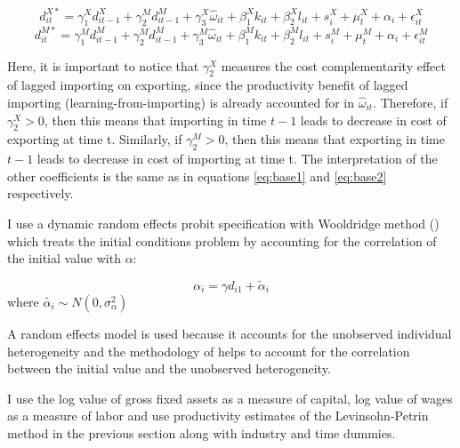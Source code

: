 \documentclass[12pt]{article}
\begin{document}
\begin{equation}
\label{eq:lag1}
d_{it}^{X*}=   \gamma_{1}^{X} d_{it-1}^{X} + \gamma_{2}^{M} d_{it-1}^{M}+
\gamma_{3}^{X} \hat{\omega}_{it}  + \beta_{1}^{X}k_{it}  +\beta_{2}^{X}l_{it}+
s_{i}^{X} + \mu_{t}^{X}  + \alpha_{i}+ \epsilon_{it}^{X}
\end{equation}
\begin{equation}
\label{eq:lag2}
d_{it}^{M*}=   \gamma_{1}^{M} d_{it-1}^{M} + \gamma_{2}^{M} d_{it-1}^{M}+
\gamma_{3}^{M} \hat{\omega}_{it}  + \beta_{1}^{M}k_{it}  +\beta_{2}^{M}l_{it}+
s_{i}^{M} + \mu_{t}^{M}  + \alpha_{i}+ \epsilon_{it}^{M}
\end{equation}

Here, it is important to notice that  $\gamma_{2}^{X}$ measures the
cost complementarity effect of lagged importing on
exporting, since the productivity benefit of lagged importing
(learning-from-importing) is already
accounted for in $\hat{\omega}_{it}$. Therefore, if $\gamma_{2}^{X}>0$, then this means that
importing in time $t-1$ leads to decrease in cost of exporting at time t.  
Similarly, if  $\gamma_{2}^{M}>0$, then this means that
exporting in time $t-1$ leads to decrease in cost of importing at time
t. The interpretation of the other coefficients is the same as in
equations \ref{eq:base1} and \ref{eq:base2} respectively. 
  
I use a dynamic random effects probit specification with Wooldridge
method (\textcite{wooldridge2005simple}) which treats the initial conditions problem by accounting for
the correlation of the initial value with $\alpha$:


$$  \alpha_{i}= \gamma d_{i1}+ \tilde{\alpha}_{i} $$
where $ \tilde{\alpha_{i}} \sim N(0, \sigma_{\alpha}^{2}) $

A random effects model is used because it accounts for the unobserved
individual heterogeneity and the methodology of
\textcite{wooldridge2005simple} helps to account for the correlation
between the initial value and the unobserved heterogeneity.
 
I use the log value of gross fixed assets as a measure of capital, log
value of wages as a measure of labor and use productivity estimates  of
the Levinsohn-Petrin method in the previous section along with
industry and time dummies.  
\end{document}
